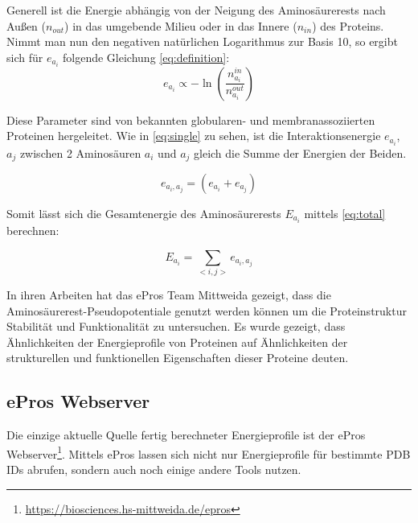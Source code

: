 Generell ist die Energie abhängig von der Neigung des Aminosäurerests nach Außen ($n_{out}$) in das umgebende Milieu oder in das Innere ($n_{in}$) des Proteins. Nimmt man nun den negativen natürlichen Logarithmus zur Basis 10, so ergibt sich für $e_{a_i}$ folgende Gleichung \ref{eq:definition}:
%
\begin{equation}
  	e_{a_i} \propto -\ln{\left(\frac{n_{a_i}^{in}}{n_{a_i}^{out}}\right)}
  	\label{eq:definition}
\end{equation}

Diese Parameter sind von bekannten globularen- und membranassoziierten Proteinen hergeleitet. Wie in \ref{eq:single} zu sehen, ist die Interaktionsenergie $e_{a_{i}}$, $a_{j}$ zwischen 2 Aminosäuren $a_{i}$ und $a_{j}$ gleich die Summe der Energien der Beiden. 

\begin{equation}
  	e_{a_{i},a_{j}} = \left( e_{a_{i}} + e_{a_{j}} \right)
    \label{eq:single}
\end{equation}

Somit lässt sich die Gesamtenergie des Aminosäurerests $E_{a_i}$ mittels \ref{eq:total} berechnen:

\begin{equation}
    E_{a_{i}} = \sum_{< i, j >}{e_{a_{i},a_{j}}}
    \label{eq:total}
\end{equation}

In ihren Arbeiten hat das ePros Team Mittweida gezeigt, dass die Aminosäurerest-Pseudopotentiale genutzt werden können um die Proteinstruktur Stabilität und Funktionalität zu untersuchen. Es wurde gezeigt, dass Ähnlichkeiten der Energieprofile von Proteinen auf Ähnlichkeiten der strukturellen und funktionellen Eigenschaften dieser Proteine deuten\cite{Heinke.2011}.


\subsection{ePros Webserver}
\label{sec:epros}
Die einzige aktuelle Quelle fertig berechneter Energieprofile ist der ePros Webserver\footnote{\url{https://biosciences.hs-mittweida.de/epros}}. Mittels ePros lassen sich nicht nur Energieprofile für bestimmte \ac{PDB} IDs abrufen, sondern auch noch einige andere Tools nutzen.

